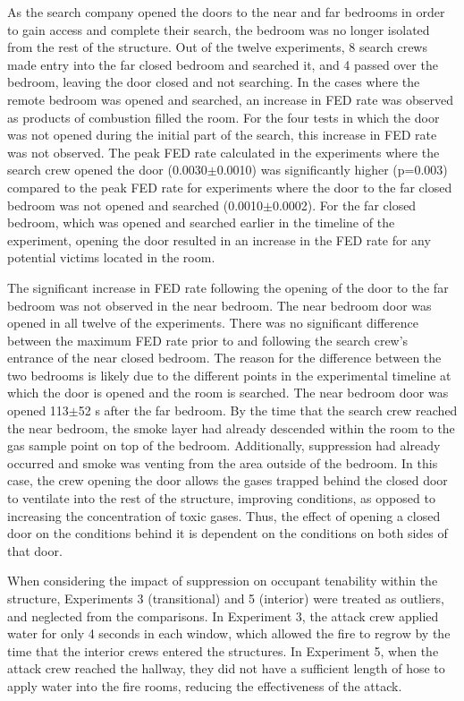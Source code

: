 \documentclass[12pt,oneside]{article}
\begin{document}
As the search company opened the doors to the near and far bedrooms in order to gain access and complete their search, the bedroom was no longer isolated from the rest of the structure. Out of the twelve experiments, 8 search crews made entry into the far closed bedroom and searched it, and 4 passed over the bedroom, leaving the door closed and not searching. In the cases where the remote bedroom was opened and searched, an increase in FED rate was observed as products of combustion filled the room. For the four tests in which the door was not opened during the initial part of the search, this increase in FED rate was not observed. The peak FED rate calculated in the experiments where the search crew opened the door (0.0030$\pm$0.0010) was significantly higher (p=0.003) compared to the peak FED rate for experiments where the door to the far closed bedroom was not opened and searched (0.0010$\pm$0.0002). For the far closed bedroom, which was opened and searched earlier in the timeline of the experiment, opening the door resulted in an increase in the FED rate for any potential victims located in the room. 

The significant increase in FED rate following the opening of the door to the far bedroom was not observed in the near bedroom. The near bedroom door was opened in all twelve of the experiments. There was no significant difference between the maximum FED rate prior to and following the search crew's entrance of the near closed bedroom. The reason for the difference between the two bedrooms is likely due to the different points in the experimental timeline at which the door is opened and the room is searched. The near bedroom door was opened 113$\pm$52 s after the far bedroom. By the time that the search crew reached the near bedroom, the smoke layer had already descended within the room to the gas sample point on top of the bedroom. Additionally, suppression had already occurred and smoke was venting from the area outside of the bedroom. In this case, the crew opening the door allows the gases trapped behind the closed door to ventilate into the rest of the structure, improving conditions, as opposed to increasing the concentration of toxic gases. Thus, the effect of opening a closed door on the conditions behind it is dependent on the conditions on both sides of that door. 

When considering the impact of suppression on occupant tenability within the structure, Experiments 3 (transitional) and 5 (interior) were treated as outliers, and neglected from the comparisons. In Experiment 3, the attack crew applied water for only 4 seconds in each window, which allowed the fire to regrow by the time that the interior crews entered the structures. In Experiment 5, when the attack crew reached the hallway, they did not have a sufficient length of hose to apply water into the fire rooms, reducing the effectiveness of the attack. 
\end{document}
